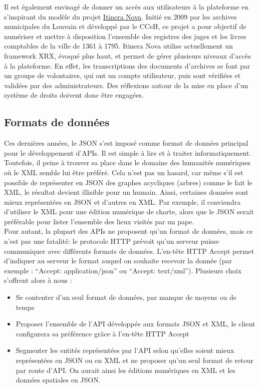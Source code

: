 Il est également envisagé de donner un accès aux utilisateurs à la plateforme en s’inspirant du modèle du projet \href{https://www.itineranova.be/in/home}{Itinera Nova}. Initié en 2009 par les archives municipales du Louvain et développé par le CCeH, ce projet a pour objectif de numériser et mettre à disposition l’ensemble des registres des juges et les livres comptables de la ville de 1361 à 1795. Itinera Nova utilise actuellement un framework XRX, évoqué plus haut, et permet de gérer plusieurs niveaux d’accès à la plateforme. En effet, les transcriptions des documents d’archives se font par un groupe de volontaires, qui ont un compte utilisateur, puis sont vérifiées et validées par des administrateurs. Des réflexions autour de la mise en place d’un système de droits doivent donc être engagées.


    \subsection{Formats de données}


Ces dernières années, le JSON s’est imposé comme format de données principal pour le développement d’APIs. Il est simple à lire et à traiter informatiquement. Toutefois, il peine à trouver sa place dans le domaine des humanités numériques où le XML semble lui être préféré. Cela n’est pas un hasard, car même s’il est possible de représenter en JSON des graphes acycliques (arbres) comme le fait le XML, le résultat devient illisible pour un humain. Ainsi, certaines données sont mieux représentées en JSON et d’autres en XML. Par exemple, il conviendra d’utiliser le XML pour une édition numérique de charte, alors que le JSON serait préférable pour lister l’ensemble des lieux visités par un pape.\\
Pour autant, la plupart des APIs ne proposent qu’un format de données, mais ce n’est pas une fatalité: le protocole HTTP prévoit qu’un serveur puisse communiquer avec différents formats de données. L’en-tête HTTP Accept permet d’indiquer au serveur le format auquel on souhaite recevoir la donnée (par exemple : “Accept: application/json” ou “Accept: text/xml”). Plusieurs choix s’offrent alors à nous :\\
\begin{itemize} 
\item Se contenter d’un seul format de données, par manque de moyens ou de temps
\item Proposer l’ensemble de l’API développée aux formats JSON et XML, le client configurera sa préférence grâce à l’en-tête HTTP Accept
\item Segmenter les entités représentées par l’API selon qu’elles soient mieux représentées en JSON ou en XML et ne proposer qu’un seul format de retour par route d’API. On aurait ainsi les éditions numériques en XML et les données spatiales en JSON.
\end{itemize}

